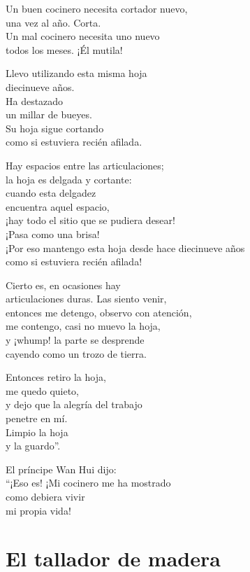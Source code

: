 \documentclass[hidelinks]{memoir}
\begin{document}
	Un buen cocinero necesita cortador nuevo,\\
	una vez al año. Corta.\\
	Un mal cocinero necesita uno nuevo\\
	todos los meses. ¡Él mutila!
	
	Llevo utilizando esta misma hoja\\
	diecinueve años.\\
	Ha destazado\\
	un millar de bueyes.\\
	Su hoja sigue cortando\\
	como si estuviera recién afilada.
	
	Hay espacios entre las articulaciones;\\
	la hoja es delgada y cortante:\\
	cuando esta delgadez\\
	encuentra aquel espacio,\\
	¡hay todo el sitio que se pudiera desear!\\
	¡Pasa como una brisa!\\
	¡Por eso mantengo esta hoja desde hace diecinueve años\\
	como si estuviera recién afilada!
	
	Cierto es, en ocasiones hay\\
	articulaciones duras. Las siento venir,\\
	entonces me detengo, observo con atención,\\
	me contengo, casi no muevo la hoja,\\
	y ¡whump! la parte se desprende\\
	cayendo como un trozo de tierra.
	
	Entonces retiro la hoja,\\
	me quedo quieto,\\
	y dejo que la alegría del trabajo\\
	penetre en mí.\\
	Limpio la hoja\\
	y la guardo''.
	
	El príncipe Wan Hui dijo:\\
	``¡Eso es! ¡Mi cocinero me ha mostrado\\
	como debiera vivir\\
	mi propia vida!
	
	\chapter*{El tallador de madera}
	
\end{document}
